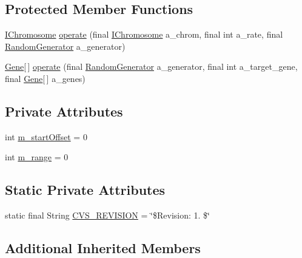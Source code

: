 \subsection*{Protected Member Functions}
\begin{DoxyCompactItemize}
\item 
\hyperlink{interfaceorg_1_1jgap_1_1_i_chromosome}{I\-Chromosome} \hyperlink{classorg_1_1jgap_1_1impl_1_1_ranged_swapping_mutation_operator_a935198d79a1378f4ec22900907a7dba8}{operate} (final \hyperlink{interfaceorg_1_1jgap_1_1_i_chromosome}{I\-Chromosome} a\-\_\-chrom, final int a\-\_\-rate, final \hyperlink{interfaceorg_1_1jgap_1_1_random_generator}{Random\-Generator} a\-\_\-generator)
\item 
\hyperlink{interfaceorg_1_1jgap_1_1_gene}{Gene}\mbox{[}$\,$\mbox{]} \hyperlink{classorg_1_1jgap_1_1impl_1_1_ranged_swapping_mutation_operator_a467b104c308084085574e951ccd8f34c}{operate} (final \hyperlink{interfaceorg_1_1jgap_1_1_random_generator}{Random\-Generator} a\-\_\-generator, final int a\-\_\-target\-\_\-gene, final \hyperlink{interfaceorg_1_1jgap_1_1_gene}{Gene}\mbox{[}$\,$\mbox{]} a\-\_\-genes)
\end{DoxyCompactItemize}
\subsection*{Private Attributes}
\begin{DoxyCompactItemize}
\item 
int \hyperlink{classorg_1_1jgap_1_1impl_1_1_ranged_swapping_mutation_operator_ade9167f0107edaa7b8f6862fe550ab30}{m\-\_\-start\-Offset} = 0
\item 
int \hyperlink{classorg_1_1jgap_1_1impl_1_1_ranged_swapping_mutation_operator_a43cfba418a2cdc0ecc47741b0af3c8d0}{m\-\_\-range} = 0
\end{DoxyCompactItemize}
\subsection*{Static Private Attributes}
\begin{DoxyCompactItemize}
\item 
static final String \hyperlink{classorg_1_1jgap_1_1impl_1_1_ranged_swapping_mutation_operator_a4c5317b6d011d40e412c929cfe902084}{C\-V\-S\-\_\-\-R\-E\-V\-I\-S\-I\-O\-N} = \char`\"{}\$Revision\-: 1. \$\char`\"{}
\end{DoxyCompactItemize}
\subsection*{Additional Inherited Members}


